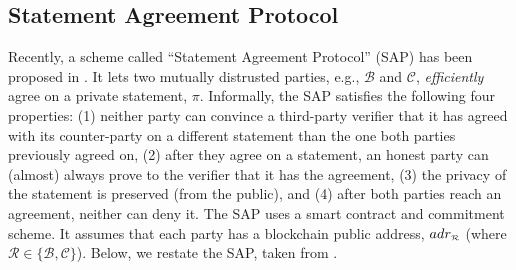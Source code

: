 


\subsection{Statement Agreement Protocol}\label{SAP}

Recently, a scheme called ``Statement Agreement Protocol'' (SAP)  has been proposed in \cite{cryptoeprint:2021:1145}. It   lets two mutually distrusted parties, e.g., $\mathcal{B}$ and $\mathcal{C}$, \emph{efficiently} agree on a private statement, $\pi$. Informally, the SAP  satisfies the following four properties: (1) neither party can convince a third-party verifier that it has agreed with its counter-party on a different statement than the one both parties previously agreed on, (2) after they agree on a statement,  an honest party can (almost) always prove to the verifier that it has the agreement, (3) the privacy of the statement is preserved (from the public), and (4) after both parties reach an agreement, neither can deny it.
%
%
The SAP uses a  smart contract and commitment scheme. It  assumes that each party  has a blockchain public address,  $adr_{\scriptscriptstyle\mathcal{R}}$ (where $\mathcal{R}\in\{\mathcal{B,C}\}$). Below, we restate  the  SAP, taken from \cite{cryptoeprint:2021:1145}. 


